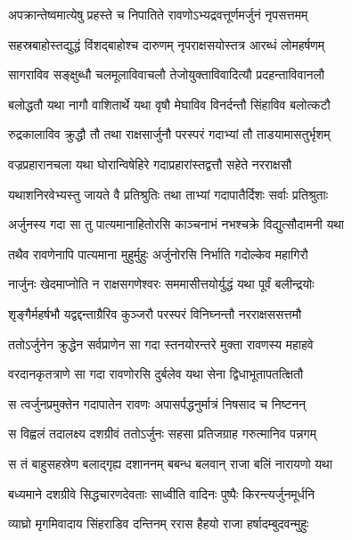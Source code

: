 \twolineshloka
{अपक्रान्तेष्वमात्येषु प्रहस्ते च निपातिते}
{रावणोऽभ्यद्रवत्तूर्णमर्जुनं नृपसत्तमम्} %

\twolineshloka
{सहस्रबाहोस्तद्युद्धं विंशद्बाहोश्च दारुणम्}
{नृपराक्षसयोस्तत्र आरब्धं लोमहर्षणम्} %

\twolineshloka
{सागराविव सङ्क्षुब्धौ चलमूलाविवाचलौ}
{तेजोयुक्ताविवादित्यौ प्रदहन्ताविवानलौ} %

\twolineshloka
{बलोद्धतौ यथा नागौ वाशितार्थे यथा वृषौ}
{मेघाविव विनर्दन्तौ सिंहाविव बलोत्कटौ} %

\twolineshloka
{रुद्रकालाविव क्रुद्धौ तौ तथा राक्षसार्जुनौ}
{परस्परं गदाभ्यां तौ ताडयामासतुर्भृशम्} %

\twolineshloka
{वज्रप्रहारानचला यथा घोरान्विषेहिरे}
{गदाप्रहारांस्तद्वत्तौ सहेते नरराक्षसौ} %

\twolineshloka
{यथाशनिरवेभ्यस्तु जायते वै प्रतिश्रुतिः}
{तथा ताभ्यां गदापातैर्दिशः सर्वाः प्रतिश्रुताः} %

\twolineshloka
{अर्जुनस्य गदा सा तु पात्यमानाहितोरसि}
{काञ्चनाभं नभश्चक्रे विद्युत्सौदामनी यथा} %

\twolineshloka
{तथैव रावणेनापि पात्यमाना मुहुर्मुहुः}
{अर्जुनोरसि निर्भाति गदोल्केव महागिरौ} %

\twolineshloka
{नार्जुनः खेदमाप्नोति न राक्षसगणेश्वरः}
{सममासीत्तयोर्युद्धं यथा पूर्वं बलीन्द्रयोः} %

\twolineshloka
{शृङ्गैर्महर्षभौ यद्वद्दन्ताग्रैरिव कुञ्जरौ}
{परस्परं विनिघ्नन्तौ नरराक्षससत्तमौ} %

\twolineshloka
{ततोऽर्जुनेन क्रुद्धेन सर्वप्राणेन सा गदा}
{स्तनयोरन्तरे मुक्ता रावणस्य महाहवे} %

\twolineshloka
{वरदानकृतत्राणे सा गदा रावणोरसि}
{दुर्बलेव यथा सेना द्विधाभूतापतत्क्षितौ} %

\twolineshloka
{स त्वर्जुनप्रमुक्तेन गदापातेन रावणः}
{अपासर्पद्धनुर्मात्रं निषसाद च निष्टनन्} %

\twolineshloka
{स विह्वलं तदालक्ष्य दशग्रीवं ततोऽर्जुनः}
{सहसा प्रतिजग्राह गरुत्मानिव पन्नगम्} %

\twolineshloka
{स तं बाहुसहस्रेण बलाद्गृह्य दशाननम्}
{बबन्ध बलवान् राजा बलिं नारायणो यथा} %

\twolineshloka
{बध्यमाने दशग्रीवे सिद्धचारणदेवताः}
{साध्वीति वादिनः पुष्पैः किरन्त्यर्जुनमूर्धनि} %

\twolineshloka
{व्याघ्रो मृगमिवादाय सिंहराडिव दन्तिनम्}
{ररास हैहयो राजा हर्षादम्बुदवन्मुहुः} %

